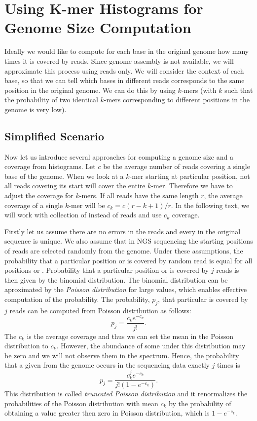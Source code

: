 \section[K-mer Histograms]{Using K-mer Histograms for Genome Size Computation}\label{sec:kmerhist}

Ideally we would like to compute for each base in the original genome how many times it is covered by reads. Since genome assembly is not available, we will approximate this process using reads only. We will consider the context of each base, so that we can tell which bases in different reads corresponds to the same position in the original genome. We can do this by using $k$-mers (with $k$ such that the probability of two identical $k$-mers corresponding to different positions in the genome is very low).

\subsection{Simplified Scenario}

Now let us introduce several approaches for computing a genome size and a coverage from \kmer histograms.
Let $c$ be the average number of reads covering a single base of the genome. When we look at a $k$-mer starting at particular position, not all reads covering its start will cover the entire $k$-mer.
Therefore we have to adjust the coverage for $k$-mers.
If all reads have the same length $r$, the average coverage of a single $k$-mer will be $c_k = c (r - k + 1)/r$.
In the following text, we will work with collection of \kmers instead of reads and use $c_k$ coverage.

Firstly let us assume there are no errors in the reads and every \kmer in the original sequence is unique.
We also assume that in NGS sequencing the starting positions of reads are selected randomly from the genome.
Under these assumptions, the probability that a particular position or \kmer is covered by random read is equal for all positions or \kmers. Probability that a particular position or \kmer is covered by $j$ reads is then given by the binomial distribution. The binomial distribution can be aproximated by the \emph{Poisson distribution} for large values, which enables effective computation of the probability.
The probability, $p_j$, that particular \kmer is covered by $j$ reads can be computed from Poisson distribution as follows:
$$ p_j =  \frac{c_k e^{-c_k}}{j!}.$$
The $c_k$ is the average coverage and thus we can set the mean in the Poisson distribution to $c_k$.
However, the abundance of some \kmers under this distribution may be zero and we will not observe them in the spectrum. Hence, the probability that a given \kmer from the genome occurs in the sequencing data exactly $j$ times is $$p_j = \frac{c_k^j e^{-c_k}}{j! (1-e^{-c_k})}.$$
This distribution is called \emph{truncated Poisson distribution} and it renormalizes the probabilities of the Poisson distribution with mean $c_k$ by the probability of obtaining a value greater then zero in Poisson distribution, which is $1-e^{-c_k}$.

